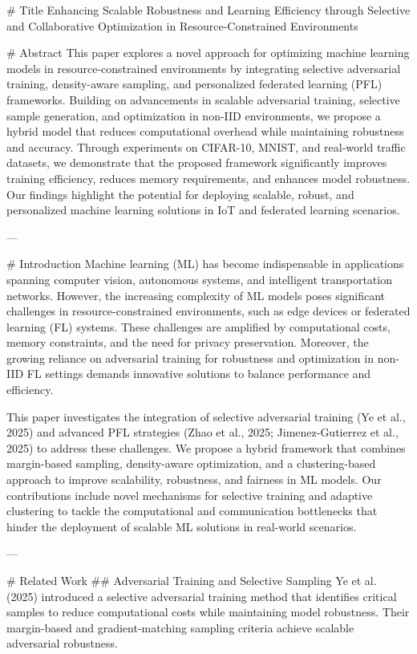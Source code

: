 # Title  
Enhancing Scalable Robustness and Learning Efficiency through Selective and Collaborative Optimization in Resource-Constrained Environments  

# Abstract  
This paper explores a novel approach for optimizing machine learning models in resource-constrained environments by integrating selective adversarial training, density-aware sampling, and personalized federated learning (PFL) frameworks. Building on advancements in scalable adversarial training, selective sample generation, and optimization in non-IID environments, we propose a hybrid model that reduces computational overhead while maintaining robustness and accuracy. Through experiments on CIFAR-10, MNIST, and real-world traffic datasets, we demonstrate that the proposed framework significantly improves training efficiency, reduces memory requirements, and enhances model robustness. Our findings highlight the potential for deploying scalable, robust, and personalized machine learning solutions in IoT and federated learning scenarios.  

---

# Introduction  
Machine learning (ML) has become indispensable in applications spanning computer vision, autonomous systems, and intelligent transportation networks. However, the increasing complexity of ML models poses significant challenges in resource-constrained environments, such as edge devices or federated learning (FL) systems. These challenges are amplified by computational costs, memory constraints, and the need for privacy preservation. Moreover, the growing reliance on adversarial training for robustness and optimization in non-IID FL settings demands innovative solutions to balance performance and efficiency.  

This paper investigates the integration of selective adversarial training (Ye et al., 2025) and advanced PFL strategies (Zhao et al., 2025; Jimenez-Gutierrez et al., 2025) to address these challenges. We propose a hybrid framework that combines margin-based sampling, density-aware optimization, and a clustering-based approach to improve scalability, robustness, and fairness in ML models. Our contributions include novel mechanisms for selective training and adaptive clustering to tackle the computational and communication bottlenecks that hinder the deployment of scalable ML solutions in real-world scenarios.  

---

# Related Work  
## Adversarial Training and Selective Sampling  
Ye et al. (2025) introduced a selective adversarial training method that identifies critical samples to reduce computational costs while maintaining model robustness. Their margin-based and gradient-matching sampling criteria achieve scalable adversarial robustness.  

